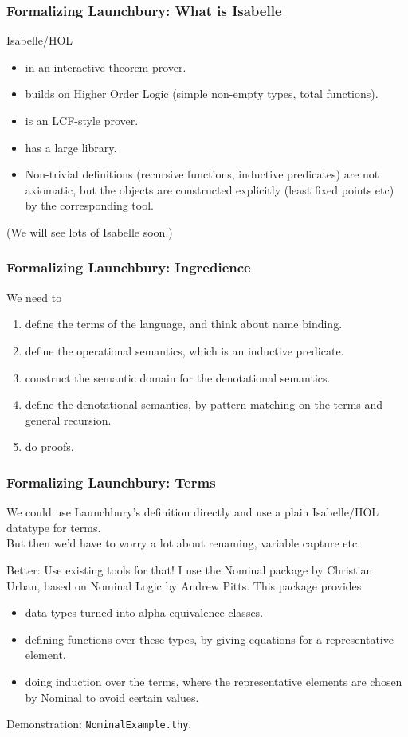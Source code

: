 \documentclass{beamer}
\begin{document}
\begin{frame}
\frametitle{Formalizing Launchbury: What is Isabelle}

Isabelle/HOL
\begin{itemize}
\item in an interactive theorem prover.
\item builds on Higher Order Logic (simple non-empty types, total functions).
\item is an LCF-style prover.
\item has a large library.
\item Non-trivial definitions (recursive functions, inductive predicates) are not axiomatic, but the objects are constructed explicitly (least fixed points etc) by the corresponding tool.
\end{itemize}

(We will see lots of Isabelle soon.)

\end{frame}

\begin{frame}
\frametitle{Formalizing Launchbury: Ingredience}
We need to
\begin{enumerate}
\item define the terms of the language, and think about name binding.
\item define the operational semantics, which is an inductive predicate.
\item construct the semantic domain for the denotational semantics.
\item define the denotational semantics, by pattern matching on the terms and general recursion.
\item do proofs.
\end{enumerate}

\end{frame}

\begin{frame}
\frametitle{Formalizing Launchbury: Terms}

We could use Launchbury's definition directly and use a plain Isabelle/HOL datatype for terms.\\
But then we’d have to worry a lot about renaming, variable capture etc.

\pause
\bigskip

Better: Use existing tools for that! I use the Nominal package by Christian Urban, based on Nominal Logic by Andrew Pitts. This package provides 

\begin{itemize}
\item data types turned into alpha-equivalence classes.
\item defining functions over these types, by giving equations for a representative element.
\item doing induction over the terms, where the representative elements are chosen by Nominal to avoid certain values.
\end{itemize}

\begin{center}
Demonstration: \texttt{NominalExample.thy}.
\end{center}
\end{frame}
\end{document}
